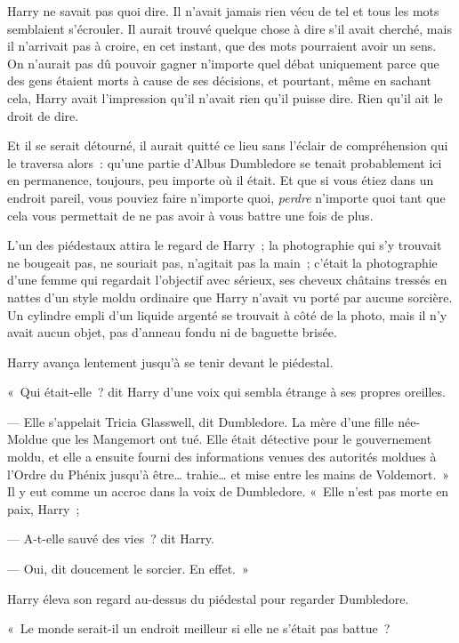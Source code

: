 Harry ne savait pas quoi dire.
Il n'avait jamais rien vécu de tel et tous les mots semblaient s'écrouler.
Il aurait trouvé quelque chose à dire s'il avait cherché, mais il n'arrivait pas à croire, en cet instant, que des mots pourraient avoir un sens.
On n'aurait pas dû pouvoir gagner n'importe quel débat uniquement parce que des gens étaient morts à cause de ses décisions, et pourtant, même en sachant cela, Harry avait l'impression qu'il n'avait rien qu'il puisse dire.
Rien qu'il ait le droit de dire.

Et il se serait détourné, il aurait quitté ce lieu sans l'éclair de compréhension qui le traversa alors~: qu'une partie d'Albus Dumbledore se tenait probablement ici en permanence, toujours, peu importe où il était.
Et que si vous étiez dans un endroit pareil, vous pouviez faire n'importe quoi, \emph{perdre} n'importe quoi tant que cela vous permettait de ne pas avoir à vous battre une fois de plus.

L'un des piédestaux attira le regard de Harry~; la photographie qui s'y trouvait ne bougeait pas, ne souriait pas, n'agitait pas la main~; c'était la photographie d'une femme qui regardait l'objectif avec sérieux, ses cheveux châtains tressés en nattes d'un style moldu ordinaire que Harry n'avait vu porté par aucune sorcière.
Un cylindre empli d'un liquide argenté se trouvait à côté de la photo, mais il n'y avait aucun objet, pas d'anneau fondu ni de baguette brisée.

Harry avança lentement jusqu'à se tenir devant le piédestal.

«~Qui était-elle~? dit Harry d'une voix qui sembla étrange à ses propres oreilles.

--- Elle s'appelait Tricia Glasswell, dit Dumbledore.
La mère d'une fille née-Moldue que les Mangemort ont tué.
Elle était détective pour le gouvernement moldu, et elle a ensuite fourni des informations venues des autorités moldues à l'Ordre du Phénix jusqu'à être… trahie… et mise entre les mains de Voldemort.~»
Il y eut comme un accroc dans la voix de Dumbledore.
«~Elle n'est pas morte en paix, Harry~;

--- A-t-elle sauvé des vies~? dit Harry.

--- Oui, dit doucement le sorcier.
En effet.~»

Harry éleva son regard au-dessus du piédestal pour regarder Dumbledore.

«~Le monde serait-il un endroit meilleur si elle ne s'était pas battue~?

